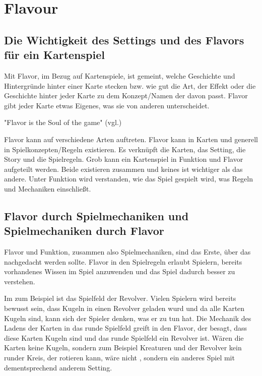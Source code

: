 
\section{Flavour}\label{sec:flavour}

\renewcommand{\kapitelautor}{Autor: Philip Jankovic}

\subsection{Die Wichtigkeit des Settings und des Flavors für ein Kartenspiel}\label{subsec:wichtigkeit-des-flavours}

%
Mit Flavor, im Bezug auf Kartenspiele, ist gemeint, welche Geschichte und Hintergründe hinter einer Karte stecken bzw.
wie gut die Art, der Effekt oder die Geschichte hinter jeder Karte zu dem Konzept/Namen der davon passt.
Flavor gibt jeder Karte etwas Eigenes, was sie von anderen unterscheidet.

"Flavor is the Soul of the game" (vgl.\cite{soulOfTheGame})


Flavor kann auf verschiedene Arten auftreten. Flavor kann in Karten und generell in Spielkonzepten/Regeln existieren.
Es verknüpft die Karten, das Setting, die Story und die Spielregeln. Grob kann ein Kartenspiel in Funktion und Flavor aufgeteilt werden.
Beide existieren zusammen und keines ist wichtiger als das andere.
Unter Funktion wird verstanden, wie das Spiel gespielt wird, was Regeln und Mechaniken einschließt. \cite{flavorAndFunction}


\subsection{Flavor durch Spielmechaniken und Spielmechaniken durch Flavor}\label{subsec:flavour-durch-mechaniken}

Flavor und Funktion, zusammen also Spielmechaniken, sind das Erste, über das nachgedacht werden sollte.
Flavor in den Spielregeln erlaubt Spielern, bereits vorhandenes Wissen im Spiel anzuwenden und das Spiel dadurch besser zu verstehen. \cite{flavorAndFunction}


Im \FF zum Beispiel ist das Spielfeld der Revolver. Vielen Spielern wird bereits bewusst sein, dass Kugeln in einen
Revolver geladen wurd und da alle Karten Kugeln sind, kann sich der Spieler denken, was er zu tun hat. Die Mechanik des Ladens
der Karten in das runde Spielfeld greift in den Flavor, der besagt, dass diese Karten Kugeln sind und das runde Spielfeld
ein Revolver ist. Wären die Karten keine Kugeln, sondern zum Beispiel Kreaturen und der Revolver kein runder Kreis,
der rotieren kann, wäre \FF nicht \FF, sondern ein anderes Spiel mit dementsprechend anderem Setting.


